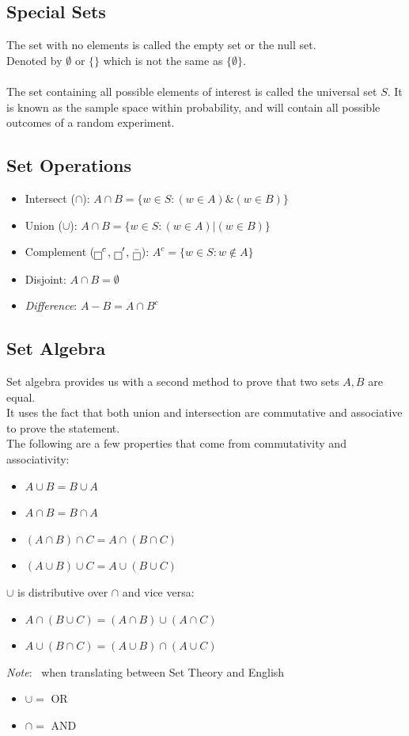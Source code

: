 \documentclass[nobib]{tufte-handout}
\newcommand{\note}[1]{
        \begin{notebox}
        \noindent\textit{Note}:\ #1
        \end{notebox}
}
\begin{document}
\subsection{Special Sets}
The set with no elements is called the empty set or the null set.\\
Denoted by $\emptyset \text{ or } \{\}$ which is not the same as $\{\emptyset\}$.\\~\\
The set containing all possible elements of interest is called the universal set $S$. It is known as the sample space within probability, and will contain all possible outcomes of a random experiment.\\
\subsection{Set Operations}
\begin{itemize}
    \item Intersect ($\cap$): $A\cap B = \{w \in S: (w \in A) \& (w \in B) \}$
    \item Union ($\cup$): $A\cap B = \{w \in S: (w \in A) | (w\in B)\}$
    \item Complement ($\fbox{\phantom{}}^c$, $\fbox{\phantom{}}'$, $\bar{\fbox{\phantom{}}}$): $A^c = \{w \in S: w \not \in A\}$
    \item Disjoint: $A\cap B = \emptyset$
    \item \textit{Difference}: $A-B = A\cap B^c$
\end{itemize}
\subsection{Set Algebra}
Set algebra provides us with a second method to prove that two sets $A,B$ are equal.\\
It uses the fact that both union and intersection are commutative and associative to prove the statement.\\
The following are a few properties that come from commutativity and associativity:
\begin{itemize}
    \item $A\cup B = B\cup A$
    \item $A\cap B = B\cap A$
    \item $(A\cap B)\cap C = A \cap(B\cap C)$
    \item $(A\cup B)\cup C = A \cup(B\cup C)$
\end{itemize}
$\cup$ is distributive over $\cap$ and vice versa:
\begin{itemize}
    \item $A \cap (B\cup C) = (A\cap B) \cup (A\cap C)$
    \item $A \cup (B\cap C) = (A\cup B) \cap (A\cup C)$
\end{itemize}
\note{ when translating between Set Theory and English
    \begin{itemize}
        \item $\cup = $ OR  
        \item $\cap = $ AND  
    \end{itemize}
}
\end{document}
